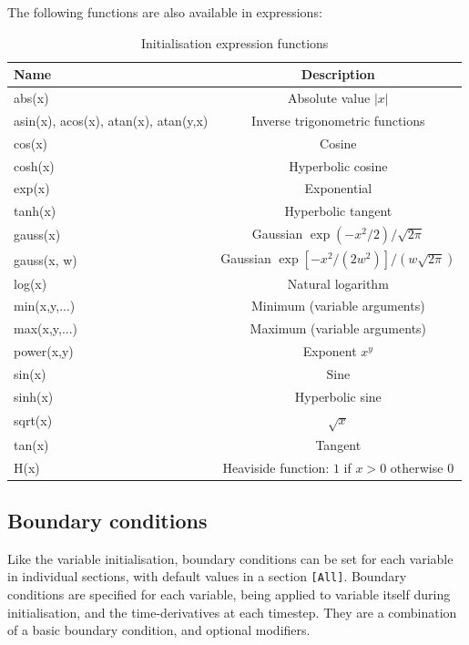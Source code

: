 \documentclass[12pt]{article}
\newcommand{\code}[1]{\texttt{#1}}
\begin{document}
The following functions are also available in expressions:
\begin{table}[htb!]
\centering
\caption{Initialisation expression functions}
\label{tab:initexprfunc}
\begin{tabular}{l | c }
\hline
Name & Description \\
\hline
abs(x) & Absolute value $\left|x\right|$\\
asin(x), acos(x), atan(x), atan(y,x) & Inverse trigonometric functions \\
cos(x) & Cosine\\
cosh(x) & Hyperbolic cosine\\
exp(x) & Exponential \\
tanh(x) & Hyperbolic tangent \\
gauss(x) & Gaussian $\exp\left(-x^2/2\right) / \sqrt{2\pi}$\\
gauss(x, w) & Gaussian $\exp\left[-x^2/\left(2w^2\right)\right] / \left(w\sqrt{2\pi}\right)$\\
log(x) & Natural logarithm \\
min(x,y,...) & Minimum (variable arguments) \\
max(x,y,...) & Maximum (variable arguments) \\
power(x,y) & Exponent $x^y$ \\
sin(x) & Sine\\
sinh(x) & Hyperbolic sine\\
sqrt(x) & $\sqrt{x}$\\
tan(x) & Tangent \\
H(x) & Heaviside function: $1$ if $x > 0$ otherwise $0$\\
\hline
\end{tabular}
\end{table}


\subsection{Boundary conditions}
\label{sec:bndryopts}
Like the variable initialisation, boundary conditions can be set for
each variable in individual sections, with default values in a section
\code{[All]}. Boundary conditions are specified for each variable, being 
applied to variable itself during initialisation, and the time-derivatives
at each timestep. They are a combination of a basic boundary condition, and
optional modifiers.
\end{document}
